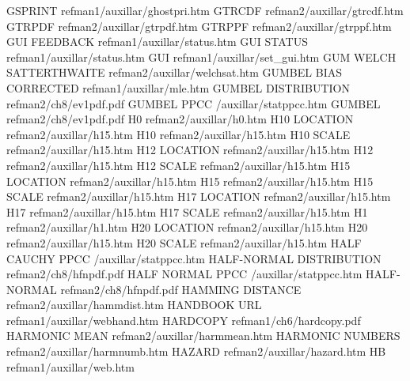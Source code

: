 GSPRINT                                 refman1/auxillar/ghostpri.htm
GTRCDF                                  refman2/auxillar/gtrcdf.htm
GTRPDF                                  refman2/auxillar/gtrpdf.htm
GTRPPF                                  refman2/auxillar/gtrppf.htm
GUI FEEDBACK                            refman1/auxillar/status.htm
GUI STATUS                              refman1/auxillar/status.htm
GUI                                     refman1/auxillar/set_gui.htm
GUM WELCH SATTERTHWAITE                 refman2/auxillar/welchsat.htm
GUMBEL BIAS CORRECTED                   refman1/auxillar/mle.htm
GUMBEL DISTRIBUTION                     refman2/ch8/ev1pdf.pdf
GUMBEL PPCC                             /auxillar/statppcc.htm
GUMBEL                                  refman2/ch8/ev1pdf.pdf
H0                                      refman2/auxillar/h0.htm
H10 LOCATION                            refman2/auxillar/h15.htm
H10                                     refman2/auxillar/h15.htm
H10 SCALE                               refman2/auxillar/h15.htm
H12 LOCATION                            refman2/auxillar/h15.htm
H12                                     refman2/auxillar/h15.htm
H12 SCALE                               refman2/auxillar/h15.htm
H15 LOCATION                            refman2/auxillar/h15.htm
H15                                     refman2/auxillar/h15.htm
H15 SCALE                               refman2/auxillar/h15.htm
H17 LOCATION                            refman2/auxillar/h15.htm
H17                                     refman2/auxillar/h15.htm
H17 SCALE                               refman2/auxillar/h15.htm
H1                                      refman2/auxillar/h1.htm
H20 LOCATION                            refman2/auxillar/h15.htm
H20                                     refman2/auxillar/h15.htm
H20 SCALE                               refman2/auxillar/h15.htm
HALF CAUCHY PPCC                        /auxillar/statppcc.htm
HALF-NORMAL DISTRIBUTION                refman2/ch8/hfnpdf.pdf
HALF NORMAL PPCC                        /auxillar/statppcc.htm
HALF-NORMAL                             refman2/ch8/hfnpdf.pdf
HAMMING DISTANCE                        refman2/auxillar/hammdist.htm
HANDBOOK URL                            refman1/auxillar/webhand.htm
HARDCOPY                                refman1/ch6/hardcopy.pdf
HARMONIC MEAN                           refman2/auxillar/harmmean.htm
HARMONIC NUMBERS                        refman2/auxillar/harmnumb.htm
HAZARD                                  refman2/auxillar/hazard.htm
HB                                      refman1/auxillar/web.htm
